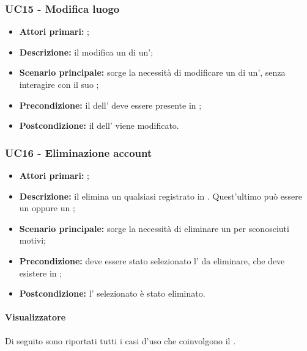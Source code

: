 \documentclass[casi-duso]{subfiles}
\begin{document}
\subsubsection{UC15 - Modifica luogo}
\label{subsub:UC15}
\begin{itemize}
  \item \textbf{Attori primari:} ;
  \item \textbf{Descrizione:} il  modifica un  di un';
  \item \textbf{Scenario principale:} sorge la necessità di modificare un  di un', senza interagire con il suo ;
  \item \textbf{Precondizione:} il  dell' deve essere presente in ;
  \item \textbf{Postcondizione:} il  dell' viene modificato.

\end{itemize}

\subsubsection{UC16 - Eliminazione account}
\label{subsub:UC16}
\begin{itemize}
  \item \textbf{Attori primari:} ;
  \item \textbf{Descrizione:} il  elimina un qualsiasi  registrato in . Quest'ultimo può essere un  oppure un ;
  \item \textbf{Scenario principale:} sorge la necessità di eliminare un  per sconosciuti motivi;
  \item \textbf{Precondizione:} deve essere stato selezionato l' da eliminare, che deve esistere in ;
  \item \textbf{Postcondizione:} l' selezionato è stato eliminato.

\end{itemize}



\paragraph{Visualizzatore}
Di seguito sono riportati tutti i casi d'uso che coinvolgono il  .
\end{document}

